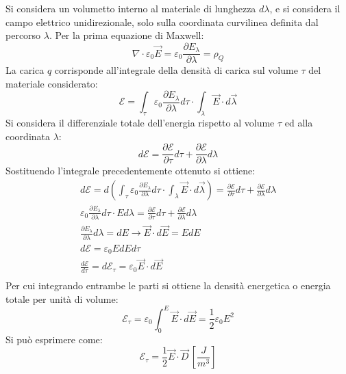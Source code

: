 \documentclass{article}
\numberwithin{equation}{subsection}
\begin{document}
Si considera un volumetto interno al materiale di lunghezza $d\lambda$, e si considera il campo elettrico unidirezionale, solo sulla coordinata curvilinea definita dal 
percorso $\lambda$. Per la prima equazione di Maxwell:
\begin{equation*}
    \nabla\cdot\varepsilon_0\vec{E}=\varepsilon_0\displaystyle\frac{\partial E_{\lambda}}{\partial\lambda}=\rho_Q
\end{equation*}
La carica $q$ corrisponde all'integrale della densità di carica sul volume $\tau$ del materiale considerato:
\begin{equation*}
    \mathscr{E}=\displaystyle\int_{\tau}\varepsilon_0\frac{\partial E_{\lambda}}{\partial\lambda}d\tau\cdot\int_{\lambda}\vec{E}\cdot d\vec{\lambda}
\end{equation*}
Si considera il differenziale totale dell'energia rispetto al volume $\tau$ ed alla coordinata $\lambda$:
\begin{equation*}
    d\mathscr{E}=\displaystyle\frac{\partial \mathscr{E}}{\partial \tau}d\tau+\frac{\partial\mathscr{E}}{\partial \lambda}d\lambda
\end{equation*}
Sostituendo l'integrale precedentemente ottenuto si ottiene:
\begin{gather*}
    d\mathscr{E}=d\left(\displaystyle\int_{\tau}\varepsilon_0\frac{\partial E_{\lambda}}{\partial\lambda}d\tau\cdot\int_{\lambda}\vec{E}\cdot d\vec{\lambda}\right)=\frac{\partial \mathscr{E}}{\partial \tau}d\tau+\frac{\partial\mathscr{E}}{\partial \lambda}d\lambda\\
    \displaystyle\varepsilon_0\frac{\partial E_{\lambda}}{\partial\lambda}d\tau\cdot Ed\lambda=\frac{\partial \mathscr{E}}{\partial \tau}d\tau+\frac{\partial\mathscr{E}}{\partial \lambda}d\lambda\\
    \displaystyle\frac{\partial E_{\lambda}}{\partial \lambda}d\lambda=dE\to\vec{E}\cdot d\vec{E}=EdE\\
    d\mathscr{E}=\varepsilon_0EdEd\tau\\
    \frac{d\mathscr{E}}{d\tau}=d\mathscr{E}_{\tau}=\varepsilon_0\vec{E}\cdot d\vec{E}\\
\end{gather*}
Per cui integrando entrambe le parti si ottiene la densità energetica o energia totale per unità di volume:
\begin{equation*}
    \mathscr{E}_\tau=\varepsilon_0\displaystyle\int_{0}^E\vec{E}\cdot d\vec{E}=\frac{1}{2}\varepsilon_0E^2
\end{equation*}
Si può esprimere come:
\begin{equation}
    \mathscr{E}_{\tau}=\displaystyle\frac{1}{2}\vec{E}\cdot\vec{D}\,\left[\frac{J}{m^3}\right]
\end{equation}
\end{document}
